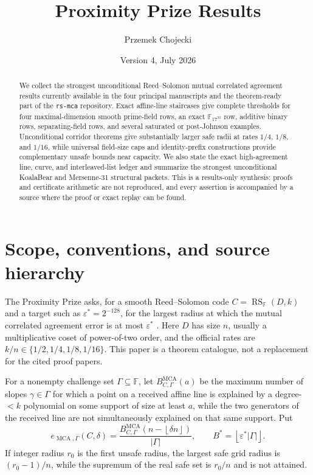 \documentclass[11pt,a4paper]{amsart}
\title{Proximity Prize Results}
\author{Przemek Chojecki}
\date{Version 4, July 2026}
\numberwithin{equation}{section}
\theoremstyle{remark}
\DeclareMathOperator{\RS}{RS}
\DeclareMathOperator{\MCA}{MCA}
\newcommand{\F}{\mathbb F}
\newcommand{\eps}{\varepsilon}
\newcommand{\abs}[1]{\lvert#1\rvert}
\newcommand{\floor}[1]{\left\lfloor#1\right\rfloor}
\begin{document}
\raggedbottom

\begin{abstract}
We collect the strongest unconditional Reed--Solomon mutual correlated agreement results currently available in the four principal manuscripts and the theorem-ready part of the \texttt{rs-mca} repository.  Exact affine-line staircases give complete thresholds for four maximal-dimension smooth prime-field rows, an exact $\mathbb F_{17^{32}}$ row, additive binary rows, separating-field rows, and several saturated or post-Johnson examples.  Unconditional corridor theorems give substantially larger safe radii at rates $1/4$, $1/8$, and $1/16$, while universal field-size caps and identity-prefix constructions provide complementary unsafe bounds near capacity.  We also state the exact high-agreement line, curve, and interleaved-list ledger and summarize the strongest unconditional KoalaBear and Mersenne-31 structural packets.  This is a results-only synthesis: proofs and certificate arithmetic are not reproduced, and every assertion is accompanied by a source where the proof or exact replay can be found.
\end{abstract}

\maketitle

\section{Scope, conventions, and source hierarchy}

The Proximity Prize asks, for a smooth Reed--Solomon code $C=\RS_{\F}(D,k)$ and a target such as $\eps^*=2^{-128}$, for the largest radius at which the mutual correlated agreement error is at most $\eps^*$ \cite{ProximityPrize,ABF26}.  Here $D$ has size $n$, usually a multiplicative coset of power-of-two order, and the official rates are $k/n\in\{1/2,1/4,1/8,1/16\}$.  This paper is a theorem catalogue, not a replacement for the cited proof papers.

For a nonempty challenge set $\Gamma\subseteq\F$, let $B_{C,\Gamma}^{\MCA}(a)$ be the maximum number of slopes $\gamma\in\Gamma$ for which a point on a received affine line is explained by a degree-$<k$ polynomial on some support of size at least $a$, while the two generators of the received line are not simultaneously explained on that same support.  Put
\[
 e_{\MCA,\Gamma}(C,\delta)
 =\frac{B_{C,\Gamma}^{\MCA}(n-\floor{\delta n})}{\abs\Gamma},
 \qquad B^*=\floor{\eps^*\abs\Gamma}.
\]
If integer radius $r_0$ is the first unsafe radius, the largest safe grid radius is $(r_0-1)/n$, while the supremum of the real safe set is $r_0/n$ and is not attained.
\end{document}
